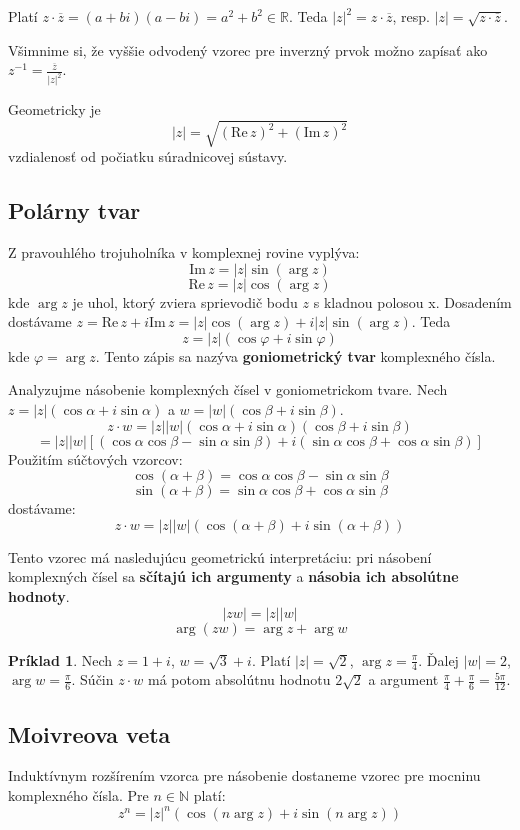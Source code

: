\documentclass[11pt,a4paper]{article}
\theoremstyle{definition}
\newtheorem{priklad}[definicia]{Príklad}
\theoremstyle{plain}
\theoremstyle{remark}
\newcommand{\Nat}{\mathbb{N}}
\newcommand{\R}{\mathbb{R}}
\begin{document}
Platí $z \cdot \overline{z} = (a+bi)(a-bi) = a^2+b^2 \in \R$. Teda $|z|^2 = z \cdot \overline{z}$, resp. $|z| = \sqrt{z \cdot \overline{z}}$.

Všimnime si, že vyššie odvodený vzorec pre inverzný prvok možno zapísať ako $z^{-1} = \frac{\overline{z}}{|z|^2}$.

Geometricky je \[
|z|=\sqrt{(\mathrm{Re}\, z)^2+(\mathrm{Im}\, z)^2}
\] vzdialenosť od počiatku súradnicovej sústavy. 

\subsection*{Polárny tvar}


Z pravouhlého trojuholníka v komplexnej rovine vyplýva:
\[ \mathrm{Im}\, z = |z| \sin(\arg z) \]
\[ \mathrm{Re}\, z = |z| \cos(\arg z) \]
kde $\arg z$ je uhol, ktorý zviera sprievodič bodu $z$ s kladnou polosou x.
Dosadením dostávame $z = \mathrm{Re}\, z + i \mathrm{Im}\, z = |z|\cos(\arg z) + i|z|\sin(\arg z)$.
Teda
\[ z = |z|(\cos \varphi + i \sin \varphi) \]
kde $\varphi = \arg z$. Tento zápis sa nazýva \textbf{goniometrický tvar} komplexného čísla.

Analyzujme násobenie komplexných čísel v goniometrickom tvare. Nech $z = |z|(\cos \alpha + i \sin \alpha)$ a $w = |w|(\cos \beta + i \sin \beta)$.
\[ z \cdot w = |z||w| (\cos \alpha + i \sin \alpha)(\cos \beta + i \sin \beta) \]
\[ = |z||w| [ (\cos \alpha \cos \beta - \sin \alpha \sin \beta) + i (\sin \alpha \cos \beta + \cos \alpha \sin \beta) ] \]
Použitím súčtových vzorcov:
\[ \cos(\alpha+\beta) = \cos \alpha \cos \beta - \sin \alpha \sin \beta \]
\[ \sin(\alpha+\beta) = \sin \alpha \cos \beta + \cos \alpha \sin \beta \]
dostávame:
\[ z \cdot w = |z||w| (\cos(\alpha+\beta) + i \sin(\alpha+\beta)) \]

Tento vzorec má nasledujúcu geometrickú interpretáciu: pri násobení komplexných čísel sa \textbf{sčítajú ich argumenty} a \textbf{násobia ich absolútne hodnoty}.
\[ |zw| = |z||w| \]
\[ \arg(zw) = \arg z + \arg w \]

\begin{priklad}
Nech $z = 1+i$, $w = \sqrt{3}+i$.
Platí $|z| = \sqrt{2}$, $\arg z = \frac{\pi}{4}$.
Ďalej $|w| = 2$, $\arg w = \frac{\pi}{6}$.
Súčin $z \cdot w$ má potom absolútnu hodnotu $2\sqrt{2}$ a argument $\frac{\pi}{4} + \frac{\pi}{6} = \frac{5\pi}{12}$.
\end{priklad}

\subsection*{Moivreova veta}
Induktívnym rozšírením vzorca pre násobenie dostaneme vzorec pre mocninu komplexného čísla. Pre $n \in \Nat$ platí:
\[ z^n = |z|^n (\cos(n \arg z) + i \sin(n \arg z)) \]
\end{document}
